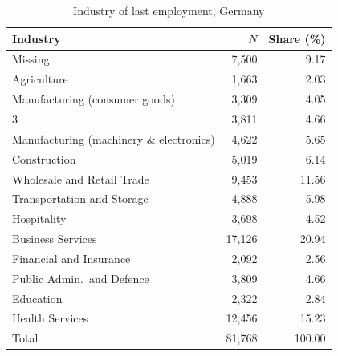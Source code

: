 \documentclass[12pt]{article}
\theoremstyle{definition}
\theoremstyle{remark}
\begin{document}
\begin{appendices}
\begin{table}[httb!]
    \centering
    \scriptsize
    \caption{Industry of last employment, Germany}
\begin{tabular}{lrr}
\toprule
Industry & $N$ & Share (\%) \\
\midrule
Missing & 7,500 & 9.17 \\
Agriculture & 1,663 & 2.03 \\
Manufacturing (consumer goods) & 3,309 & 4.05 \\
3 & 3,811 & 4.66 \\
Manufacturing (machinery \& electronics) & 4,622 & 5.65 \\
Construction & 5,019 & 6.14 \\
Wholesale and Retail Trade & 9,453 & 11.56 \\
Transportation and Storage & 4,888 & 5.98 \\
Hospitality & 3,698 & 4.52 \\
Business Services & 17,126 & 20.94 \\
Financial and Insurance & 2,092 & 2.56 \\
Public Admin.\ and Defence & 3,809 & 4.66 \\
Education & 2,322 & 2.84 \\
Health Services & 12,456 & 15.23 \\
\midrule
Total & 81,768 & 100.00 \\
\bottomrule
\end{tabular}

\label{ind_DE}
\vspace{0.5cm}


\end{table}
\end{appendices}
\end{document}
